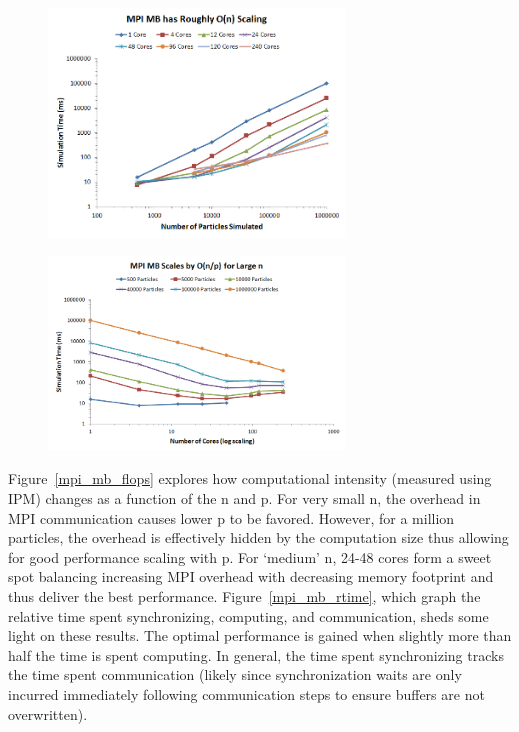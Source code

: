 \documentclass[11pt]{article} %
\begin{document}
\begin{figure}[!h]
\centering
\includegraphics[width=0.7\textwidth]{figures/mpi_mb_n.png}
\caption{}
\label{mpi_mb_n}
\end{figure}

\begin{figure}[!h]
\centering
\includegraphics[width=0.7\textwidth]{figures/mpi_mb_p.png}
\caption{}
\label{mpi_mb_p}
\end{figure}

Figure~\ref{mpi_mb_flops} explores how computational intensity (measured using IPM) changes as a function of the n and p. For very small n, the overhead in MPI communication causes lower p to be favored. However, for a million particles, the overhead is effectively hidden by the computation size thus allowing for good performance scaling with p. For `medium' n, 24-48 cores form a sweet spot balancing increasing MPI overhead with decreasing memory footprint and thus deliver the best performance. Figure~\ref{mpi_mb_rtime}, which graph the relative time spent synchronizing, computing, and communication, sheds some light on these results. The optimal performance is gained when slightly more than half the time is spent computing. In general, the time spent synchronizing tracks the time spent communication (likely since synchronization waits are only incurred immediately following communication steps to ensure buffers are not overwritten).
\end{document}
